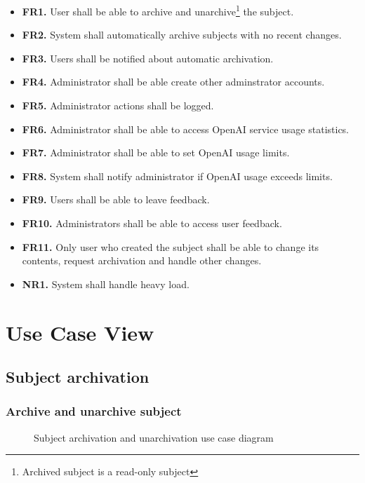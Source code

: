 \documentclass[
    english, %
]{VUMIFPSkursinis}
\begin{document}
\begin{itemize}
    \item \textbf{FR1.} User shall be able to archive and unarchive\footnote{Archived subject is a read-only subject} the subject.
    \item \textbf{FR2.} System shall automatically archive subjects with no recent changes.
    \item \textbf{FR3.} Users shall be notified about automatic archivation.
    \item \textbf{FR4.} Administrator shall be able create other adminstrator accounts.
    \item \textbf{FR5.} Administrator actions shall be logged.
    \item \textbf{FR6.} Administrator shall be able to access OpenAI service usage statistics.
    \item \textbf{FR7.} Administrator shall be able to set OpenAI usage limits.
    \item \textbf{FR8.} System shall notify administrator if OpenAI usage exceeds limits.
    \item \textbf{FR9.} Users shall be able to leave feedback.
    \item \textbf{FR10.} Administrators shall be able to access user feedback.
    \item \textbf{FR11.} Only user who created the subject shall be able to change its contents, request archivation and handle other changes.
    \item \textbf{NR1.} System shall handle heavy load.
\end{itemize}

\section{Use Case View}

\subsection{Subject archivation}

\subsubsection{Archive and unarchive subject}

\begin{figure}[ht]
    \centering
    
    \label{archivation-use-case}
    \caption{Subject archivation and unarchivation use case diagram}
\end{figure}
\end{document}
